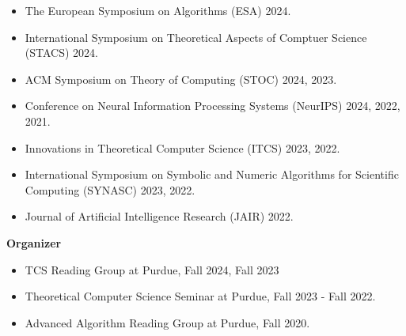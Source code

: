 \documentclass[margin, 10pt]{res} %
\begin{document}
\begin{resume}
\begin{itemize}
\item The European Symposium on Algorithms (ESA) 2024.
\item International Symposium on Theoretical Aspects of Comptuer Science (STACS) 2024.
\item ACM Symposium on Theory of Computing (STOC) 2024, 2023.
\item Conference on Neural Information Processing Systems (NeurIPS) 2024, 2022, 2021.
\item Innovations in Theoretical Computer Science (ITCS) 2023, 2022.
\item International Symposium on Symbolic and Numeric Algorithms for Scientific Computing (SYNASC) 2023, 2022.
\item Journal of Artificial Intelligence Research (JAIR) 2022.
\end{itemize}
{\bf Organizer}

\begin{itemize}
\item TCS Reading Group at Purdue, Fall 2024, Fall 2023
\item Theoretical Computer Science Seminar at Purdue, Fall 2023 - Fall 2022.
\item Advanced Algorithm Reading Group at Purdue, Fall 2020.
\end{itemize}


\end{resume}
\end{document}
